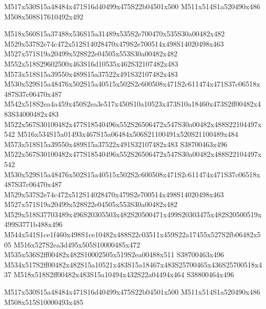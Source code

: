 \documentclass{article}
\begin{document}
\begin{multicols}{2}

\begin{center}
M517x530S15a48484x471S16d40499x475S22b04501x500 M511x514S1a520490x486 M508x508S17610492x492 
\end{center}





M518x560S15a37488x536S15a31489x535S2e700470x535S30a00482x482 M529x537S2e74c472x512S14028470x479S2e700514x498S14020498x463 M527x571S19a20499x528S22e04505x553S30a00482x482 M552x518S29602500x463S16d10535x462S32107482x483 M573x518S15a39550x489S15a37522x491S32107482x483 M530x529S15a48476x502S15a40515x502S2c600508x471S2c611474x471S37c06518x487S37c06470x487 M542x518S2ea4a459x450S2ea3e517x450S10a10523x473S10a18460x473S2ff00482x483S34000482x483 M522x567S30100482x477S18540496x552S26506472x547S30a00482x488S22104497x542 M516x534S15a01493x467S15a06484x506S21100491x520S21100489x484 M573x518S15a39550x489S15a37522x491S32107482x483 S38700463x496 M522x567S30100482x477S18540496x552S26506472x547S30a00482x488S22104497x542 M530x529S15a48476x502S15a40515x502S2c600508x471S2c611474x471S37c06518x487S37c06470x487 M529x537S2e74c472x512S14028470x479S2e700514x498S14020498x463 M527x571S19a20499x528S22e04505x553S30a00482x482 M529x518S37703489x496S20305503x482S20500471x499S20303475x482S20500519x499S3771b488x496 M544x541S1ce1f460x498S1ce10482x488S22c03511x459S22a17455x527S2fb06482x505 M516x527S2ea3d495x505S10000485x472 M535x536S2ff00482x482S10002505x519S2ea00488x511 S38700463x496 M534x517S2ff00482x482S15a10521x483S15a18467x483S25700465x436S25700518x437 M518x518S2ff00482x483S15a10494x432S22a04494x464 S38800464x496


\begin{center}
M517x530S15a48484x471S16d40499x475S22b04501x500 M511x514S1a520490x486 M508x515S10000493x485 
\end{center}



\end{multicols}
\end{document}

